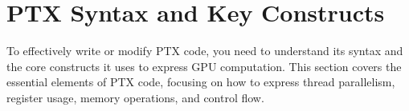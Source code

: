 \section{PTX Syntax and Key Constructs}

To effectively write or modify PTX code, you need to understand its syntax and the core constructs it uses to express GPU computation. This section covers the essential elements of PTX code, focusing on how to express thread parallelism, register usage, memory operations, and control flow.

